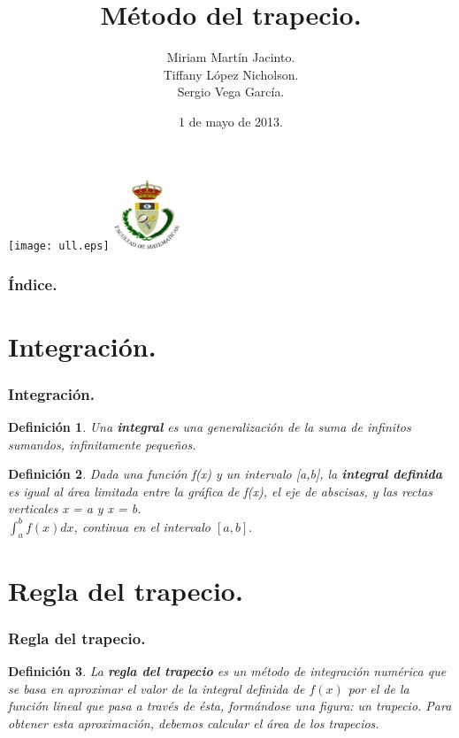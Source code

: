 \documentclass{beamer}
\title[Integración]{Método del trapecio.}
\author[Grupo-2D]{Miriam Martín Jacinto.\\Tiffany López Nicholson.\\Sergio Vega García.}
\date[01/05/2013]{1 de mayo de 2013.}
\newtheorem{definicion}{Definición}
\begin{document}
  \begin{frame}
    \texttt{[image: ull.eps]}
    \hspace{7cm}
    \includegraphics[width=0.15\textwidth]{fmatesc.eps}
    \titlepage
  \end{frame}
  \begin{frame}
    \frametitle{Índice.}
    \tableofcontents[pausesections]
  \end{frame}
  \section{Integración.}
  \begin{frame}
    \frametitle{Integración.}
      \begin{definicion}
	Una \textbf{integral} es una generalización de la suma de infinitos sumandos, infinitamente pequeños.
      \end{definicion}
	
      \begin{definicion}
	Dada una función f(x) y un intervalo [a,b], la \textbf{integral definida} es igual al área limitada entre la gráfica de f(x), el eje de abscisas, y las rectas verticales x = a y x = b.\\
	$\int_{a}^{b} f(x) dx$, continua en el intervalo $[a, b].$
      \end{definicion}
  \end{frame}
  \section{Regla del trapecio.}
  \begin{frame}
    \frametitle{Regla del trapecio.}
    \begin{definicion}
      La \textbf{regla del trapecio} es un método de integración numérica que se basa en aproximar el valor de la integral definida de $f(x)$ por el de la función lineal que pasa a través de ésta, formándose una figura: un trapecio. Para obtener esta aproximación, debemos calcular el área de los trapecios.
    \end{definicion}
  \end{frame}
\end{document}
